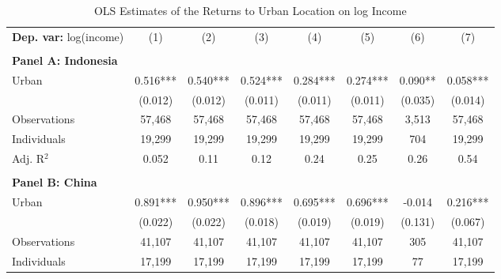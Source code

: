 \begin{table}[htbp] \centering \begin{threeparttable}
 \caption{OLS Estimates of the Returns to Urban Location on log Income} 
 \label{tab:OLS_income_urban_unb} 
\begin{tabular}{l ccccccc} \toprule  \textbf{Dep. var:}  log(income) 
                    &\multicolumn{1}{c}{(1)}   &\multicolumn{1}{c}{(2)}   &\multicolumn{1}{c}{(3)}   &\multicolumn{1}{c}{(4)}   &\multicolumn{1}{c}{(5)}   &\multicolumn{1}{c}{(6)}   &\multicolumn{1}{c}{(7)}   \\
                    &               &               &               &               &               &               &               \\
\textbf{Panel A: Indonesia} \\
Urban               &       0.516***&       0.540***&       0.524***&       0.284***&       0.274***&       0.090** &       0.058***\\
                    &     (0.012)   &     (0.012)   &     (0.011)   &     (0.011)   &     (0.011)   &     (0.035)   &     (0.014)   \\
\addlinespace
Observations        &      57,468   &      57,468   &      57,468   &      57,468   &      57,468   &       3,513   &      57,468   \\
Individuals         &      19,299   &      19,299   &      19,299   &      19,299   &      19,299   &         704   &      19,299   \\
Adj. R$^{2}$        &       0.052   &        0.11   &        0.12   &        0.24   &        0.25   &        0.26   &        0.54   \\
\cmidrule{2 -8}
                    &               &               &               &               &               &               &               \\
\textbf{Panel B: China} \\
Urban               &       0.891***&       0.950***&       0.896***&       0.695***&       0.696***&      -0.014   &       0.216***\\
                    &     (0.022)   &     (0.022)   &     (0.018)   &     (0.019)   &     (0.019)   &     (0.131)   &     (0.067)   \\
\addlinespace
Observations        &      41,107   &      41,107   &      41,107   &      41,107   &      41,107   &         305   &      41,107   \\
Individuals         &      17,199   &      17,199   &      17,199   &      17,199   &      17,199   &          77   &      17,199   \\

\end{tabular}
\end{threeparttable}
\end{table}
